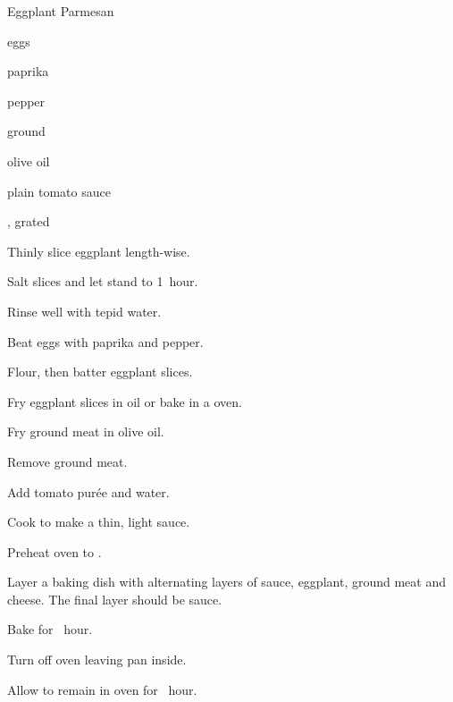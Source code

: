 \begin{recipe}{Eggplant Parmesan\FIXME}{}{}

\begin{ingredients}
\item {}
\item eggs
\item paprika
\item pepper
\item ground 
\item olive oil
\item plain tomato sauce
\item {}, grated
\end{ingredients}

\begin{directions}
\item Thinly slice eggplant length-wise.
\item Salt slices and let stand \half{} to 1~hour.
\item Rinse well with tepid water.
\item Beat eggs with paprika and pepper.
\item Flour, then batter eggplant slices.
\item Fry eggplant slices in oil or bake in a  oven.
\item Fry ground meat in olive oil.
\item Remove ground meat.
\item Add tomato pur\'ee and water.
\item Cook to make a thin, light sauce.
\item Preheat oven to .
\item Layer a baking dish with alternating layers of sauce, eggplant, ground meat and cheese. The final layer should be sauce.
\item Bake for \half~hour.
\item Turn off oven leaving pan inside.
\item Allow to remain in oven for \half~hour.
\end{directions}

\end{recipe}
